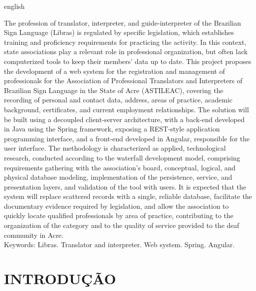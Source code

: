 \documentclass[
        oneside,      %
        english,			
        brazil			 
        ]{abntspiifac}
\begin{document}
 
\begin{resumo}[ABSTRACT]
 \begin{otherlanguage*}{english}

The profession of translator, interpreter, and guide-interpreter of the Brazilian Sign Language (Libras) is regulated by specific legislation, which establishes training and proficiency requirements for practicing the activity. In this context, state associations play a relevant role in professional organization, but often lack computerized tools to keep their members' data up to date. This project proposes the development of a web system for the registration and management of professionals for the Association of Professional Translators and Interpreters of Brazilian Sign Language in the State of Acre (ASTILEAC), covering the recording of personal and contact data, address, areas of practice, academic background, certificates, and current employment relationships. The solution will be built using a decoupled client-server architecture, with a back-end developed in Java using the Spring framework, exposing a REST-style application programming interface, and a front-end developed in Angular, responsible for the user interface. The methodology is characterized as applied, technological research, conducted according to the waterfall development model, comprising requirements gathering with the association's board, conceptual, logical, and physical database modeling, implementation of the persistence, service, and presentation layers, and validation of the tool with users. It is expected that the system will replace scattered records with a single, reliable database, facilitate the documentary evidence required by legislation, and allow the association to quickly locate qualified professionals by area of practice, contributing to the organization of the category and to the quality of service provided to the deaf community in Acre.\\[18pt]
Keywords: Libras. Translator and interpreter. Web system. Spring. Angular.
 \end{otherlanguage*}
\end{resumo}



\tableofcontents*
\cleardoublepage


\textual


\chapter{INTRODUÇÃO}
\end{document}
